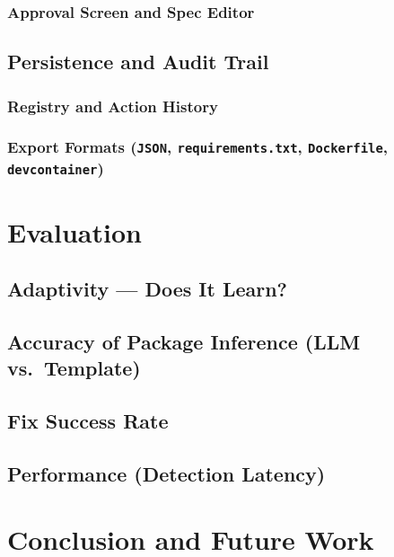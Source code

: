 \documentclass[12pt,a4paper]{article}
\begin{document}
\subsubsection{Approval Screen and Spec Editor}

\subsection{Persistence and Audit Trail}

\subsubsection{Registry and Action History}

\subsubsection{Export Formats (\texttt{JSON}, \texttt{requirements.txt}, 
    \texttt{Dockerfile}, \texttt{devcontainer})}

\section{Evaluation}

\subsection{Adaptivity --- Does It Learn?}

\subsection{Accuracy of Package Inference (LLM vs.\ Template)}

\subsection{Fix Success Rate}

\subsection{Performance (Detection Latency)}

\section{Conclusion and Future Work}
\end{document}
